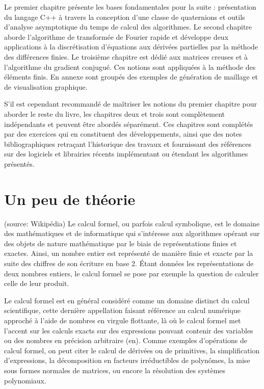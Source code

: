 \documentclass[11pt,fleqn]{book} %
\begin{document}
Le premier chapitre présente les bases fondamentales pour la suite : présentation du langage C++ à travers la conception d'une classe de quaternions et outils d'analyse asymptotique du temps de calcul des algorithmes. Le second chapitre aborde l'algorithme de transformée de Fourier rapide et développe deux applications à la discrétisation d'équations aux dérivées partielles par la méthode des différences finies. Le troisième chapitre est dédié aux matrices creuses et à l'algorithme du gradient conjugué. Ces notions sont appliquées à la méthode des éléments finis. En annexe sont groupés des exemples de génération de maillage et de visualisation graphique. 

S'il est cependant recommandé de maîtriser les notions du premier chapitre pour aborder le reste du livre, les chapitres deux et trois sont complètement indépendants et peuvent être abordés séparément. Ces chapitres sont complétés par des exercices qui en constituent des développements, ainsi que des notes bibliographiques retraçant l'historique des travaux et fournissant des références sur des logiciels et librairies récents implémentant ou étendant les algorithmes présentés. 

\section{Un peu de théorie}(source: Wikipédia)
Le calcul formel, ou parfois calcul symbolique, est le domaine des mathématiques et de informatique qui s'intéresse aux algorithmes opérant sur des objets de nature mathématique par le biais de représentations finies et exactes. Ainsi, un nombre entier est représenté de manière finie et exacte par la suite des chiffres de son écriture en base 2. Étant données les représentations de deux nombres entiers, le calcul formel se pose par exemple la question de calculer celle de leur produit.

Le calcul formel est en général considéré comme un domaine distinct du calcul scientifique, cette dernière appellation faisant référence au calcul numérique approché à l'aide de nombres en virgule flottante, là où le calcul formel met l'accent sur les calculs exacts sur des expressions pouvant contenir des variables ou des nombres en précision arbitraire (en). Comme exemples d'opérations de calcul formel, on peut citer le calcul de dérivées ou de primitives, la simplification d'expressions, la décomposition en facteurs irréductibles de polynômes, la mise sous formes normales de matrices, ou encore la résolution des systèmes polynomiaux.
\end{document}
